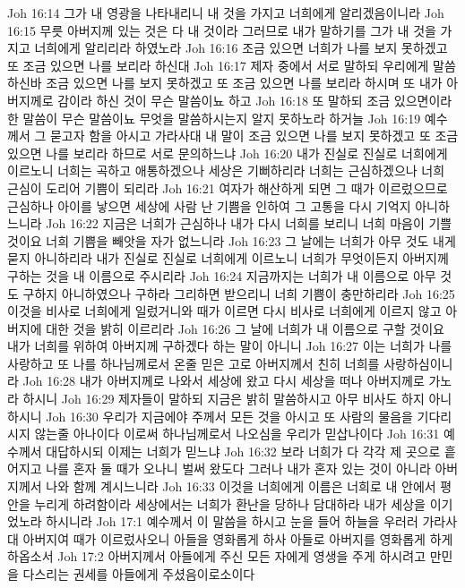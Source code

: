 Joh 16:14  그가 내 영광을 나타내리니 내 것을 가지고 너희에게 알리겠음이니라
Joh 16:15  무릇 아버지께 있는 것은 다 내 것이라 그러므로 내가 말하기를 그가 내 것을 가지고 너희에게 알리리라 하였노라
Joh 16:16  조금 있으면 너희가 나를 보지 못하겠고 또 조금 있으면 나를 보리라 하신대
Joh 16:17  제자 중에서 서로 말하되 우리에게 말씀하신바 조금 있으면 나를 보지 못하겠고 또 조금 있으면 나를 보리라 하시며 또 내가 아버지께로 감이라 하신 것이 무슨 말씀이뇨 하고
Joh 16:18  또 말하되 조금 있으면이라한 말씀이 무슨 말씀이뇨 무엇을 말씀하시는지 알지 못하노라 하거늘
Joh 16:19  예수께서 그 묻고자 함을 아시고 가라사대 내 말이 조금 있으면 나를 보지 못하겠고 또 조금 있으면 나를 보리라 하므로 서로 문의하느냐
Joh 16:20  내가 진실로 진실로 너희에게 이르노니 너희는 곡하고 애통하겠으나 세상은 기뻐하리라 너희는 근심하겠으나 너희 근심이 도리어 기쁨이 되리라
Joh 16:21  여자가 해산하게 되면 그 때가 이르렀으므로 근심하나 아이를 낳으면 세상에 사람 난 기쁨을 인하여 그 고통을 다시 기억지 아니하느니라
Joh 16:22  지금은 너희가 근심하나 내가 다시 너희를 보리니 너희 마음이 기쁠 것이요 너희 기쁨을 빼앗을 자가 없느니라
Joh 16:23  그 날에는 너희가 아무 것도 내게 묻지 아니하리라 내가 진실로 진실로 너희에게 이르노니 너희가 무엇이든지 아버지께 구하는 것을 내 이름으로 주시리라
Joh 16:24  지금까지는 너희가 내 이름으로 아무 것도 구하지 아니하였으나 구하라 그리하면 받으리니 너희 기쁨이 충만하리라
Joh 16:25  이것을 비사로 너희에게 일렀거니와 때가 이르면 다시 비사로 너희에게 이르지 않고 아버지에 대한 것을 밝히 이르리라
Joh 16:26  그 날에 너희가 내 이름으로 구할 것이요 내가 너희를 위하여 아버지께 구하겠다 하는 말이 아니니
Joh 16:27  이는 너희가 나를 사랑하고 또 나를 하나님께로서 온줄 믿은 고로 아버지께서 친히 너희를 사랑하심이니라
Joh 16:28  내가 아버지께로 나와서 세상에 왔고 다시 세상을 떠나 아버지께로 가노라 하시니
Joh 16:29  제자들이 말하되 지금은 밝히 말씀하시고 아무 비사도 하지 아니하시니
Joh 16:30  우리가 지금에야 주께서 모든 것을 아시고 또 사람의 물음을 기다리시지 않는줄 아나이다 이로써 하나님께로서 나오심을 우리가 믿삽나이다
Joh 16:31  예수께서 대답하시되 이제는 너희가 믿느냐
Joh 16:32  보라 너희가 다 각각 제 곳으로 흩어지고 나를 혼자 둘 때가 오나니 벌써 왔도다 그러나 내가 혼자 있는 것이 아니라 아버지께서 나와 함께 계시느니라
Joh 16:33  이것을 너희에게 이름은 너희로 내 안에서 평안을 누리게 하려함이라 세상에서는 너희가 환난을 당하나 담대하라 내가 세상을 이기었노라 하시니라
Joh 17:1  예수께서 이 말씀을 하시고 눈을 들어 하늘을 우러러 가라사대 아버지여 때가 이르렀사오니 아들을 영화롭게 하사 아들로 아버지를 영화롭게 하게 하옵소서
Joh 17:2  아버지께서 아들에게 주신 모든 자에게 영생을 주게 하시려고 만민을 다스리는 권세를 아들에게 주셨음이로소이다
